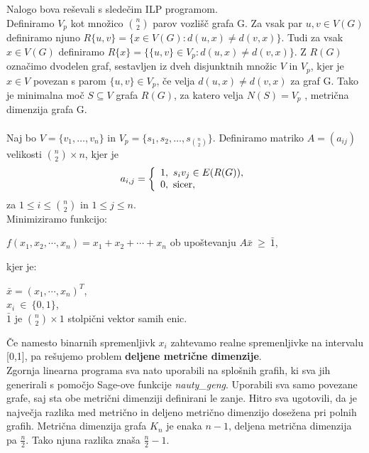 \documentclass[a4paper]{report}
\begin{document}
Nalogo bova reševali s sledečim ILP programom.\\

Definiramo $V_p$ kot množico $\binom{n}{2}$ parov vozlišč grafa G. Za vsak par $u,v \in V(G)$ definiramo njuno $R\{u,v\}=\{x \in V(G): d(u,x)\neq d(v,x)\}.$ Tudi za vsak $x \in V(G)$ definiramo $R\{x\}= \{\{u,v\}\in V_p: d(u,x)\neq d(v,x)\}$. Z $R(G)$ označimo dvodelen graf, sestavljen iz dveh disjunktnih množic $V$ in $V_p$, kjer je $x \in V$ povezan s parom $\{u,v\} \in V_p$, če velja $d(u,x)\neq d(v,x)$ za graf G.  Tako je minimalna moč $S \subseteq V$ grafa $R(G)$, za katero velja $N(S) = V_p$  , metrična dimenzija grafa G. \\\\
Naj bo $V = \{v_1,\dots, v_n\}$ in $V_p = \{s_1,s_2,\dots,s_{\binom{n}{2}} \} $. Definiramo matriko  $ A = (a_{ij})$  velikosti $\binom{n}{2} \times n$, kjer je\[ a_{i,j}  =  \left \{ \begin{array}{l}1,\ \mbox{$ s_i v_j \in E(R(G))$}, \\0,\ \mbox{sicer}, \end{array} \right. \]
za $1\le i\le \binom{n}{2}$ in $1\le  j\le n$.\\

 Minimiziramo funkcijo: \begin{center}$f(x_1,x_2, \cdots,x_n)=x_1+x_2+\cdots+x_n$ 
ob upoštevanju $A\bar{x}\ \ge\ \bar{1}$,\end{center} 
kjer je: \begin{center}
 $\bar{x}=(x_1,\cdots,x_n)^T$,\\
$x_i\ \in\ \{0,1 \}$,\\
$\bar{1}$ je $\binom{n}{2}\times 1$  stolpični vektor samih enic. \end{center}
Če namesto binarnih spremenljivk $x_i$ zahtevamo realne spremenljivke na intervalu [0,1], pa rešujemo problem \textbf{deljene metrične dimenzije}. \\

Zgornja linearna programa sva nato uporabili na splošnih grafih, ki sva jih generirali s pomočjo Sage-ove funkcije \textit{nauty\_geng}. Uporabili sva samo povezane grafe, saj sta obe metrični dimenziji definirani le zanje. Hitro sva ugotovili, da je največja razlika med metrično in deljeno metrično dimenzijo dosežena pri polnih grafih. Metrična dimenzija grafa $K_n$ je enaka $n-1$, deljena metrična dimenzija pa $\frac{n}{2}$. Tako njuna razlika znaša $\frac{n}{2}-1$. \\
\end{document}
